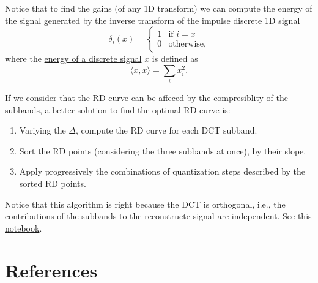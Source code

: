 Notice that to find the gains (of any 1D transform) we can compute the
energy of the signal generated by the inverse transform of the impulse
discrete 1D signal
\begin{equation}
  \delta_{i}(x) = 
  \left\{
  \begin{array}{ll}
    1 & \text{if $i=x$}\\
    0 & \text{otherwise},
  \end{array}
  \right.
\end{equation}
where the
\href{https://en.wikipedia.org/wiki/Energy_(signal_processing)}{energy
  of a discrete signal} $x$ is defined as
\begin{equation}
  \langle x, x\rangle =  \sum_{i}{x_i^2}.
\end{equation}

If we consider that the RD curve can be affeced by the compresiblity of the subbands, a better solution to find the optimal RD curve is:
\begin{enumerate}
\item Variying the $\Delta$, compute the RD curve for each DCT
  subband.
\item Sort the RD points (considering the three subbands at once), by
  their slope.
\item Apply progressively the combinations of quantization steps
  described by the sorted RD points.
\end{enumerate}
Notice that this algorithm is right because the DCT is orthogonal,
i.e., the contributions of the subbands to the reconstructe signal are
independent. See this \href{https://github.com/Sistemas-Multimedia/Sistemas-Multimedia.github.io/blob/master/study_guide/06-color_transform/color-DCT_compression.ipynb}{notebook}. %

\section{References}

\renewcommand{\addcontentsline}[3]{}%

